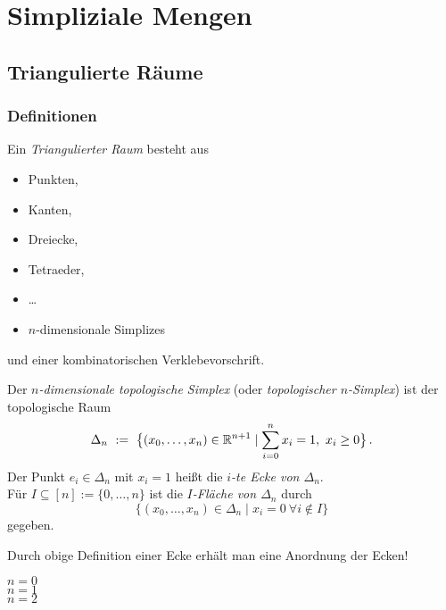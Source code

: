 \chapter{Simpliziale Mengen}
\section{Triangulierte Räume}
\subsection{Definitionen}

\begin{definition}
  Ein \emph{Triangulierter Raum} besteht aus
  \begin{itemize}
    \item Punkten,
    \item Kanten,
    \item Dreiecke,
    \item Tetraeder,
    \item \ldots
    \item $n$-dimensionale Simplizes
  \end{itemize}
  und einer kombinatorischen Verklebevorschrift.
\end{definition}

\begin{definition}
  Der \emph{$n$-dimensionale topologische Simplex} (oder \emph{topologischer
  $n$-Simplex}) ist der topologische Raum
  \[ \Delta_n \ :=\  \big\{(x_0,\ldots,x_n) \in \mathbb{R}^{n+1} \mid 
    \sum_{i=0}^n x_i = 1,\ x_i \geq 0\big\}\,.\]
  Der Punkt $e_i \in \Delta_n$ mit $x_i=1$ heißt die \emph{$i$-te Ecke von
  $\Delta_n$}.\\
  Für $I \subseteq [n] := \{0,\ldots,n\}$ ist die \emph{$I$-Fläche von
  $\Delta_n$} durch
  \[ \big\{(x_0,\ldots, x_n) \in \Delta_n \mid 
    x_i = 0 \ \forall i\notin I\big\}\]
  gegeben.
\end{definition}

\begin{bemerkung}
  Durch obige Definition einer Ecke erhält man eine Anordnung der Ecken!
\end{bemerkung}

\begin{beispiel}
  \begin{description}
    \item[$n=0$] \Bild
    \item[$n=1$] \Bild
    \item[$n=2$] \Bild
  \end{description}
\end{beispiel}


